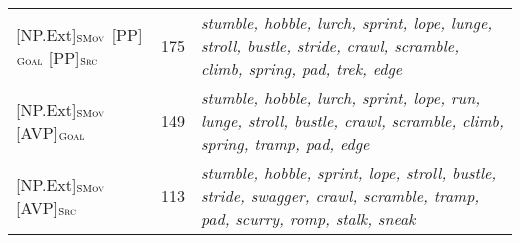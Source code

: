 \documentclass[output=paper,colorlinks,citecolor=brown]{langscibook}
\begin{document}
\begin{table}
\begin{tabularx}{\textwidth}{lrQ}
{[NP.Ext]}$_{\text{\textsc{SMov}}}$ {[PP]}$_{\text{\textsc{Goal}}}$ {[PP]}$_{\text{\textsc{Src}}}$  & 175 & \textit{stumble, hobble, lurch, sprint, lope, lunge, stroll, bustle, stride, crawl, scramble, climb, spring, pad, trek, edge%
}\\

{[NP.Ext]}$_{\text{\textsc{SMov}}}$ {[AVP]}$_{\text{\textsc{Goal}}}$  & 149 & \textit{stumble, hobble, lurch, sprint, lope, run, lunge, stroll, bustle, crawl, scramble, climb, spring, tramp, pad, edge%
}\\

{[NP.Ext]}$_{\text{\textsc{SMov}}}$ {[AVP]}$_{\text{\textsc{Src}}}$  & 113 & \textit{stumble, hobble, sprint, lope, stroll, bustle, stride, swagger, crawl, scramble, tramp, pad, scurry, romp, stalk, sneak%
}\\


\end{tabularx}
\end{table}
\end{document}
